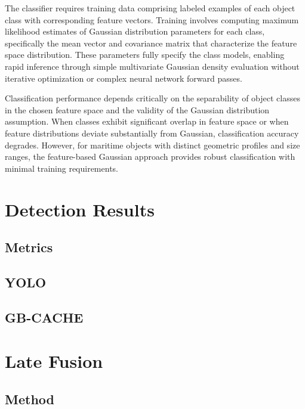 \documentclass{erauthesis}
\begin{document}
The classifier requires training data comprising labeled examples of each object class with corresponding feature vectors.
Training involves computing maximum likelihood estimates of Gaussian distribution parameters for each class, specifically the mean vector and covariance matrix that characterize the feature space distribution.
These parameters fully specify the class models, enabling rapid inference through simple multivariate Gaussian density evaluation without iterative optimization or complex neural network forward passes.

Classification performance depends critically on the separability of object classes in the chosen feature space and the validity of the Gaussian distribution assumption.
When classes exhibit significant overlap in feature space or when feature distributions deviate substantially from Gaussian, classification accuracy degrades.
However, for maritime objects with distinct geometric profiles and size ranges, the feature-based Gaussian approach provides robust classification with minimal training requirements.

\section{Detection Results} \label{detect_results}

\subsection{Metrics} \label{detect_metrics}
\subsection{YOLO} \label{detect_yolo}
\subsection{GB-CACHE} \label{detect_gbcache}

\section{Late Fusion} \label{fusion}
\subsection{Method} \label{fusion_method}
\end{document}
